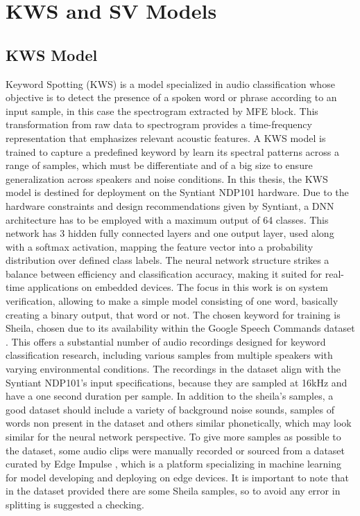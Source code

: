 \chapter{KWS and SV Models}
\label{cha:training}
\section{KWS Model}
\label{sec:kws deployment}
Keyword Spotting (KWS) is a model specialized in audio classification whose objective is to detect the presence of a spoken word or phrase according to an input sample, in this case the spectrogram extracted by MFE block. This transformation from raw data to spectrogram provides a time-frequency representation that emphasizes relevant acoustic features. A KWS model is trained to capture a predefined keyword by learn its spectral patterns across a range of samples, which must be differentiate and of a big size to ensure generalization across speakers and noise conditions.
In this thesis, the KWS model is destined for deployment on the Syntiant NDP101 hardware. Due to the hardware constraints and design recommendations given by Syntiant, a DNN architecture has to be employed with a maximum output of 64 classes. This network has 3 hidden fully connected layers and one output layer, used along with a softmax activation, mapping the feature vector into a probability distribution over defined class labels. The neural network structure strikes a balance between efficiency and classification accuracy, making it suited for real-time applications on embedded devices.
The focus in this work is on system verification, allowing to make a simple model consisting of one word, basically creating a binary output, that word or not. The chosen keyword for training is Sheila, chosen due to its availability within the Google Speech Commands dataset \cite{speechcommands}. This offers a substantial number of audio recordings designed for keyword classification research, including various samples from multiple speakers with varying environmental conditions.
The recordings in the dataset align with the Syntiant NDP101's input specifications, because they are sampled at 16kHz and have a one second duration per sample. In addition to the sheila’s samples, a good dataset should include a variety of background noise sounds, samples of words non present in the dataset and others similar phonetically, which may look similar for the neural network perspective. To give more samples as possible to the dataset, some audio clips were manually recorded or sourced from a dataset curated by Edge Impulse \cite{edgeimpulse_dataset_499022}, which is a platform specializing in machine learning for model developing and deploying on edge devices. It is important to note that in the dataset provided there are some Sheila samples, so to avoid any error in splitting is suggested a checking.
